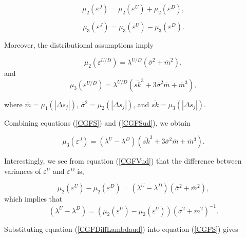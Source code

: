 \documentclass[11pt]{article}
\begin{document}
\begin{small}
\begin{equation}
\mu_{2}(\varepsilon^{J}) = \mu_{2}(\varepsilon^{U}) + \mu_{2}(\varepsilon^{D}), \label{CGFV}
\end{equation}

\begin{equation}
\mu_{3}(\varepsilon^{J}) = \mu_{3}(\varepsilon^{U}) - \mu_{3}(\varepsilon^{D}). \label{CGFS}
\end{equation}

Moreover, the distributional assumptions imply

\begin{equation}
\mu_{2}(\varepsilon^{U/D})=\lambda^{U/D} \left( \overline {\sigma}^{2} + \overline {m}^{2} \right), \label{CGFVud}
\end{equation}
and
\begin{equation}
\mu_{3}(\varepsilon^{U/D})=\lambda^{U/D} \left( \overline{sk}^{3}+ 3\overline {\sigma}^{2}\overline {m} + \overline {m}^{3} \right), \label{CGFSud}
\end{equation}

where $\overline {m}=\mu_{1}(| \Delta s_{j} |)$, $\overline {\sigma}^{2}=\mu_{2}(| \Delta s_{j} |)$, and $\overline{sk}=\mu_{3}(| \Delta s_{j} |)$.

Combining equations (\ref{CGFS}) and (\ref{CGFSud}), we obtain

\begin{equation}
\mu_{3}(\varepsilon^{J}) = \left( \lambda^{U}-\lambda^{D} \right) \left( \overline{sk}^{3}+ 3\overline {\sigma}^{2}\overline {m} + \overline {m}^{3} \right). \label{CGFSDiffud}
\end{equation}

Interestingly, we see from equation (\ref{CGFVud}) that the difference between variances of $\varepsilon^{U}$ and $\varepsilon^{D}$ is,

\begin{equation}
\mu_{2}(\varepsilon^{U})-\mu_{2}(\varepsilon^{D})=\left( \lambda^{U}-\lambda^{D} \right) \left( \overline {\sigma}^{2} + \overline {m}^{2} \right), \label{CGFDiffVud}
\end{equation}
which implies that
\begin{equation}
\left( \lambda^{U}-\lambda^{D} \right)= \left( \mu_{2}(\varepsilon^{U})-\mu_{2}(\varepsilon^{U}) \right)\left( \overline {\sigma}^{2} + \overline {m}^{2} \right)^{-1} . \label{CGFDiffLambdaud}
\end{equation}

Substituting equation (\ref{CGFDiffLambdaud}) into equation (\ref{CGFS}) gives


\end{small}
\end{document}

